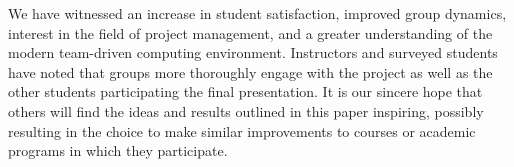 \documentclass{sig-alternate}
\begin{document}
We have witnessed an increase in student satisfaction, improved group dynamics, interest in the
field of project management, and a greater understanding of the modern team-driven computing environment. 
Instructors and surveyed students have noted that groups more thoroughly engage with the
project as well as the other students participating the final presentation. It is our sincere hope that others
will find the ideas and results outlined in this paper inspiring, possibly resulting in the choice to make
similar improvements to courses or academic programs in which they participate.

\balance


\end{document}
